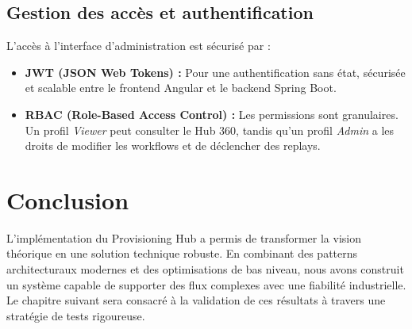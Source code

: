 \subsection{Gestion des accès et authentification}
L'accès à l'interface d'administration est sécurisé par :
\begin{itemize}
    \item \textbf{JWT (JSON Web Tokens) :} Pour une authentification sans état, sécurisée et scalable entre le frontend Angular et le backend Spring Boot.
    \item \textbf{RBAC (Role-Based Access Control) :} Les permissions sont granulaires. Un profil \textit{Viewer} peut consulter le Hub 360, tandis qu'un profil \textit{Admin} a les droits de modifier les workflows et de déclencher des replays.
\end{itemize}

\section{Conclusion}
L'implémentation du Provisioning Hub a permis de transformer la vision théorique en une solution technique robuste. En combinant des patterns architecturaux modernes et des optimisations de bas niveau, nous avons construit un système capable de supporter des flux complexes avec une fiabilité industrielle. Le chapitre suivant sera consacré à la validation de ces résultats à travers une stratégie de tests rigoureuse.
